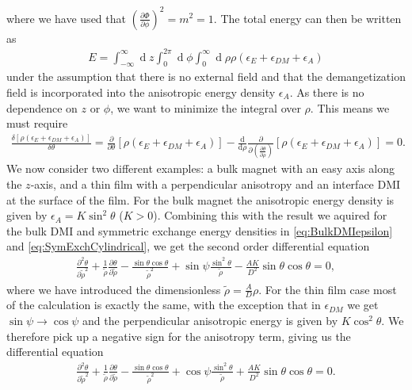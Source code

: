 \documentclass[12pt, a4paper, twoside, openright]{article}		%
\renewcommand{\d}[1]{\ensuremath{\operatorname{d}\!{#1}}}
\numberwithin{equation}{section}
\begin{document}
where we have used that $(\frac{\partial\Phi}{\partial\phi})^2=m^2=1$. The total energy can then be written as
\begin{align}
E = \int_{-\infty}^{\infty}\d z \int_0^{2\pi} \d\phi\int_0^{\infty} \d\rho \rho \left(\epsilon_E + \epsilon_{DM} + \epsilon_A\right)
\end{align}
under the assumption that there is no external field and that the demangetization field is incorporated into the anisotropic energy density $\epsilon_A$. As there is no dependence on $z$ or $\phi$, we want to minimize the integral over $\rho$. This means we must require
\begin{align}
\frac{\delta \left[\rho\left(\epsilon_E+\epsilon_{DM}+\epsilon_A\right)\right]}{\delta\theta} = \frac{\partial}{\partial\theta}\left[\rho\left(\epsilon_E+\epsilon_{DM}+\epsilon_A\right)\right] - \frac{\textrm{d}}{\textrm{d}\rho} \frac{\partial}{\partial(\frac{\partial \theta}{\partial\rho})}\left[\rho\left(\epsilon_E+\epsilon_{DM}+\epsilon_A\right)\right] = 0.
\end{align}
We now consider two different examples: a bulk magnet with an easy axis along the $z$-axis, and a thin film with a perpendicular anisotropy and an interface DMI at the surface of the film. For the bulk magnet the anisotropic energy density is given by $\epsilon_A = K\sin^2\theta$ ($K>0$). Combining this with the result we aquired for the bulk DMI and symmetric exchange energy densities in \eqref{eq:BulkDMIepsilon} and \eqref{eq:SymExchCylindrical}, we get the second order differential equation
\begin{align}
\label{eq:ODEthetaBulk}
\frac{\partial^2\theta}{\partial\tilde{\rho}^2} + \frac{1}{\tilde{\rho}}\frac{\partial\theta}{\partial\tilde{\rho}} - \frac{\sin\theta\cos\theta}{\tilde{\rho}^2}+\sin\psi\frac{\sin^2\theta}{\tilde{\rho}}-\frac{AK}{D^2}\sin\theta\cos\theta = 0,
\end{align}
where we have introduced the dimensionless $\tilde{\rho} = \frac{A}{D}\rho$. For the thin film case most of the calculation is exactly the same, with the exception that in $\epsilon_{DM}$ we get $\sin\psi\rightarrow\cos\psi$ and the perpendicular anisotropic energy is given by $K\cos^2\theta$. We therefore pick up a negative sign for the anisotropy term, giving us the differential equation
\begin{align}
\label{eq:ODEthetaFilm}
\frac{\partial^2\theta}{\partial\tilde{\rho}^2} + \frac{1}{\tilde{\rho}}\frac{\partial\theta}{\partial\tilde{\rho}} - \frac{\sin\theta\cos\theta}{\tilde{\rho}^2}+\cos\psi\frac{\sin^2\theta}{\tilde{\rho}}+\frac{AK}{D^2}\sin\theta\cos\theta = 0.
\end{align}
\end{document}

